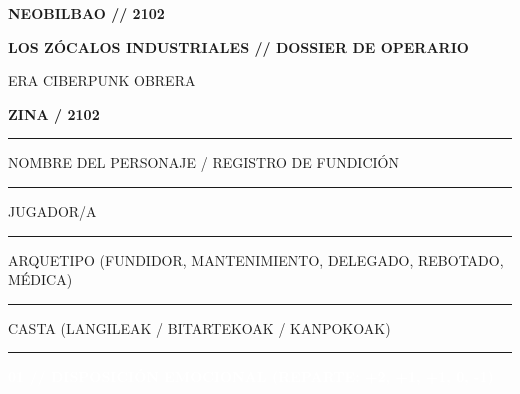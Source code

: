 \documentclass[10pt,a4paper,oneside]{book}
\newcommand{\field}[2][\linewidth]{%
  \begin{minipage}[t]{#1}
  \textcolor{InkSoft}{\terminalfont\scriptsize\MakeUppercase{#2}}\par
  \vspace{1mm}\textcolor{Line}{\rule{\linewidth}{0.45pt}}
  \end{minipage}}
\newcommand{\strip}[1]{%
  \vspace{0.8mm}\noindent
  \colorbox{CarbonDark}{\parbox{\dimexpr\linewidth-2\fboxsep\relax}{%
    \textcolor{white}{\industrialfont\bfseries\small\MakeUppercase{#1}}}}\par
  \vspace{0.8mm}}
\begin{document}
\pagecolor{Paper}

\noindent
\begin{minipage}[c]{0.68\linewidth}
  {\industrialfont\bfseries\fontsize{22}{23}\selectfont\color{CarbonDark}NEOBILBAO // 2102}\par
  \vspace{0.5mm}
  {\industrialfont\bfseries\small\color{OrekakRust}LOS ZÓCALOS INDUSTRIALES \textcolor{BurdinUrdin}{//} DOSSIER DE OPERARIO}
\end{minipage}%
\hfill
\begin{minipage}[c]{0.28\linewidth}
  \raggedleft
  {\terminalfont\scriptsize\color{InkSoft}ERA CIBERPUNK OBRERA}\par
  {\industrialfont\bfseries\large\color{BurdinUrdin}ZINA / 2102}
\end{minipage}

\vspace{1mm}
\textcolor{OrekakRust}{\rule{\linewidth}{1.2pt}}
\vspace{1mm}

\begin{minipage}[t]{0.58\linewidth}
  \field{Nombre del personaje / registro de fundición}
\end{minipage}\hfill
\begin{minipage}[t]{0.38\linewidth}
  \field{Jugador/a}
\end{minipage}

\vspace{0.5mm}
\begin{minipage}[t]{0.58\linewidth}
  \field{Arquetipo (Fundidor, Mantenimiento, Delegado, Rebotado, Médica)}
\end{minipage}\hfill
\begin{minipage}[t]{0.38\linewidth}
  \field{Casta (Langileak / Bitartekoak / Kanpokoak)}
\end{minipage}

\strip{01 // Disposición emocional (reparte: +2, +1, +1, 0, -1)}
\end{document}
